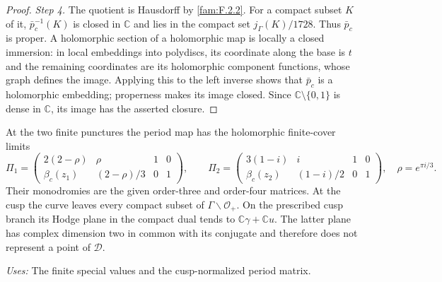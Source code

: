 \begin{proof}
\par\noindent\textit{Step 4.} The quotient is Hausdorff by \ref{fam:F.2.2}.  For a compact subset $K$ of it,
$\bar p_c^{-1}(K)$ is closed in $\mathbb C$ and lies in the compact set
$j_\Gamma(K)/1728$.  Thus $\bar p_c$ is proper.  A holomorphic section of
a holomorphic map is locally a closed immersion: in local embeddings
into polydiscs, its coordinate along the base is $t$ and the remaining
coordinates are its holomorphic component functions, whose graph
defines the image.  Applying this to the left inverse shows that
$\bar p_c$ is a holomorphic embedding; properness makes its image
closed.  Since $\mathbb C\setminus\{0,1\}$ is dense in $\mathbb C$, its
image has the asserted closure.
\end{proof}

\begin{proposition}[FAM F.3.2; T]\label{fam:F.3.2}
At the two finite punctures the period map has the holomorphic
finite-cover limits
\[
 \Pi_1=
 \begin{pmatrix}2(2-\rho)&\rho&1&0\\
 \beta_c(z_1)&(2-\rho)/3&0&1\end{pmatrix},\qquad
 \Pi_2=
 \begin{pmatrix}3(1-i)&i&1&0\\
 \beta_c(z_2)&(1-i)/2&0&1\end{pmatrix},
 \quad \rho=e^{\pi i/3}.
\]
Their monodromies are the given order-three and order-four matrices.
At the cusp the curve leaves every compact subset of
$\Gamma\backslash\mathcal O_+$.  On the prescribed cusp branch its
Hodge plane in the compact dual tends to
$\mathbb C\gamma+\mathbb Cu$.  The latter plane has complex dimension
two in common with its conjugate and therefore does not represent a
point of $\mathcal D$.
\end{proposition}
\noindent\emph{Uses:} The finite special values and the cusp-normalized period matrix.\par

